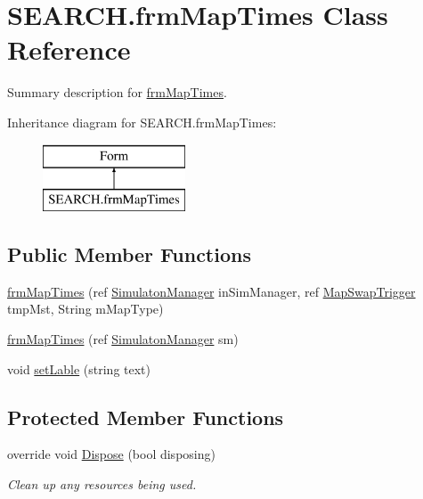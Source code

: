 \hypertarget{class_s_e_a_r_c_h_1_1frm_map_times}{\section{S\-E\-A\-R\-C\-H.\-frm\-Map\-Times Class Reference}
\label{class_s_e_a_r_c_h_1_1frm_map_times}
}


Summary description for \hyperlink{class_s_e_a_r_c_h_1_1frm_map_times}{frm\-Map\-Times}.  


Inheritance diagram for S\-E\-A\-R\-C\-H.\-frm\-Map\-Times\-:\begin{figure}[H]
\begin{center}
\leavevmode
\includegraphics[height=2.000000cm]{class_s_e_a_r_c_h_1_1frm_map_times}
\end{center}
\end{figure}
\subsection*{Public Member Functions}
\begin{DoxyCompactItemize}
\item 
\hyperlink{class_s_e_a_r_c_h_1_1frm_map_times_ae48489a3e6a7d31d7af5abf36a2cc3f1}{frm\-Map\-Times} (ref \hyperlink{class_s_e_a_r_c_h_1_1_simulaton_manager}{Simulaton\-Manager} in\-Sim\-Manager, ref \hyperlink{class_s_e_a_r_c_h_1_1_map_swap_trigger}{Map\-Swap\-Trigger} tmp\-Mst, String m\-Map\-Type)
\item 
\hyperlink{class_s_e_a_r_c_h_1_1frm_map_times_a7c723815a75d7e0838c47e96698dfba5}{frm\-Map\-Times} (ref \hyperlink{class_s_e_a_r_c_h_1_1_simulaton_manager}{Simulaton\-Manager} sm)
\item 
void \hyperlink{class_s_e_a_r_c_h_1_1frm_map_times_ae9b425c5ad54d0010a535e95cba593dc}{set\-Lable} (string text)
\end{DoxyCompactItemize}
\subsection*{Protected Member Functions}
\begin{DoxyCompactItemize}
\item 
override void \hyperlink{class_s_e_a_r_c_h_1_1frm_map_times_aa721e91db1b8b9c446b391ab991a0b50}{Dispose} (bool disposing)
\begin{DoxyCompactList}\small\item\em Clean up any resources being used. \end{DoxyCompactList}\end{DoxyCompactItemize}
